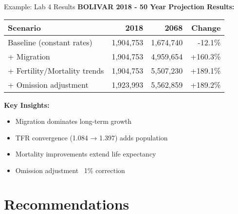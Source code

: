 \documentclass[aspectratio=169]{beamer}
\begin{document}
\begin{frame}{Example: Lab 4 Results}
\textbf{BOLIVAR 2018 - 50 Year Projection Results:}

\begin{table}
\small
\begin{tabular}{lrrr}
\toprule
\textbf{Scenario} & \textbf{2018} & \textbf{2068} & \textbf{Change} \\
\midrule
Baseline (constant rates) & 1,904,753 & 1,674,740 & -12.1\% \\
+ Migration & 1,904,753 & 4,959,654 & +160.3\% \\
+ Fertility/Mortality trends & 1,904,753 & 5,507,230 & +189.1\% \\
+ Omission adjustment & 1,923,993 & 5,562,859 & +189.2\% \\
\bottomrule
\end{tabular}
\end{table}

\vspace{0.3cm}

\textbf{Key Insights:}
\begin{itemize}
    \item Migration dominates long-term growth
    \item TFR convergence (1.084 → 1.397) adds population
    \item Mortality improvements extend life expectancy
    \item Omission adjustment ~1\% correction
\end{itemize}
\end{frame}

\section{Recommendations}
\end{document}
